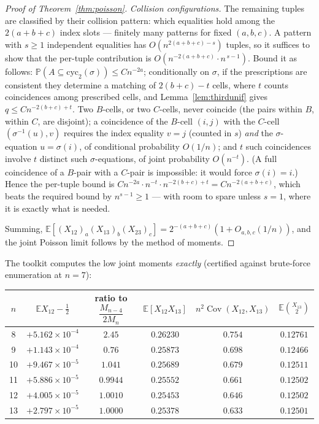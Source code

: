 \documentclass[11pt]{article}
\theoremstyle{definition}
\newcommand{\E}{\mathbb{E}}
\renewcommand{\Pr}{\mathbb{P}}
\begin{document}
\begin{proof}[Proof of Theorem~\ref{thm:poisson}]
\emph{Collision configurations.}  The remaining tuples are classified by
their collision pattern: which equalities hold among the $2(a+b+c)$
index slots --- finitely many patterns for fixed $(a,b,c)$.  A pattern
with $s\ge1$ independent equalities has $O(n^{2(a+b+c)-s})$ tuples, so it
suffices to show that the per-tuple contribution is
$O(n^{-2(a+b+c)}\cdot n^{\,s-1})$.  Bound it as follows:
$\Pr(A\subseteq\mathrm{cyc}_2(\sigma))\le C n^{-2a}$; conditionally on
$\sigma$, if the prescriptions are consistent they determine a matching
of $2(b+c)-t$ cells, where $t$ counts coincidences among prescribed
cells, and Lemma~\ref{lem:thirdunif} gives
$q\le Cn^{-2(b+c)+t}$.  Two $B$-cells, or two $C$-cells, never coincide
(the pairs within $B$, within $C$, are disjoint); a coincidence of the
$B$-cell $(i,j)$ with the $C$-cell $(\sigma^{-1}(u),v)$ requires the
index equality $v=j$ (counted in $s$) \emph{and} the $\sigma$-equation
$u=\sigma(i)$, of conditional probability $O(1/n)$; and $t$ such
coincidences involve $t$ distinct such $\sigma$-equations, of joint
probability $O(n^{-t})$.  (A full coincidence of a $B$-pair with a
$C$-pair is impossible: it would force $\sigma(i)=i$.)  Hence the
per-tuple bound is $Cn^{-2a}\cdot n^{-t}\cdot n^{-2(b+c)+t}
=Cn^{-2(a+b+c)}$, which beats the required bound by $n^{s-1}\ge1$
--- with room to spare unless $s=1$, where it is exactly what is needed.

Summing, $\E[(X_{12})_a(X_{13})_b(X_{23})_c]
=2^{-(a+b+c)}(1+O_{a,b,c}(1/n))$, and the joint Poisson limit follows by
the method of moments.
\end{proof}

The toolkit computes the low joint moments \emph{exactly} (certified against
brute-force enumeration at $n=7$):

\begin{center}
\small
\begin{tabular}{c c c c c c}
\toprule
$n$ & $\E X_{12}-\tfrac12$ & ratio to $\dfrac{M_{n-4}}{2M_n}$ &
$\E[X_{12}X_{13}]$ & $n^2\operatorname{Cov}(X_{12},X_{13})$ &
$\E\binom{X_{13}}2$\\
\midrule
8  & $+5.162\times10^{-4}$ & $2.45$ & $0.26230$ & $0.754$ & $0.12761$\\
9  & $+1.143\times10^{-4}$ & $0.76$ & $0.25873$ & $0.698$ & $0.12466$\\
10 & $+9.467\times10^{-5}$ & $1.041$ & $0.25689$ & $0.679$ & $0.12511$\\
11 & $+5.886\times10^{-5}$ & $0.9944$ & $0.25552$ & $0.661$ & $0.12502$\\
12 & $+4.005\times10^{-5}$ & $1.0010$ & $0.25453$ & $0.646$ & $0.12502$\\
13 & $+2.797\times10^{-5}$ & $1.0000$ & $0.25378$ & $0.633$ & $0.12501$\\
\bottomrule
\end{tabular}
\end{center}
\end{document}
